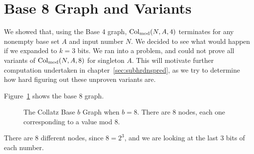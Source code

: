 \section{Base 8 Graph and Variants} \label{subsec:base8graphsubpblms}
We showed that, using the Base 4 graph, $\mathrm{Col}_{\text{mod}}(N,A,4)$ terminates for any nonempty base set $A$ and input number $N$. We decided to see what would happen if we expanded to $k = 3$ bits. We ran into a problem, and could not prove all variants of $\mathrm{Col}_{\text{mod}}(N,A,8)$ for singleton $A$. This will motivate further computation undertaken in chapter~\ref{sec:subhrdnspred}, as we try to determine how hard figuring out these unproven variants are. \par
Figure~\ref{fig:base_8_graph} shows the base 8 graph.
\begin{figure}
    \centering
    \caption{The Collatz Base $b$ Graph when $b = 8$. There are 8 nodes, each one corresponding to a value mod 8.}
    \label{fig:base_8_graph}
\end{figure}
There are 8 different nodes, since $8 = 2^3$, and we are looking at the last 3 bits of each number. 
